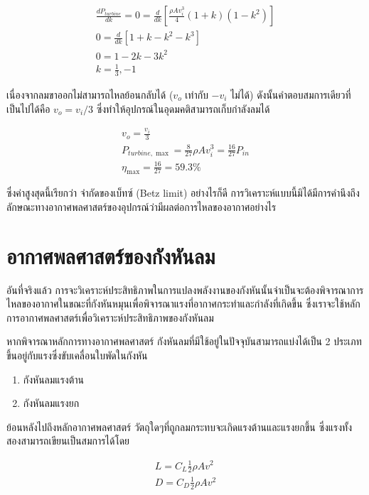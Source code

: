 \message{ !name(solar.tex)}\documentclass[
a4paper,
svgnames,
openany,
justified,
]{tufte-book}
\begin{document}
\begin{gather}
 \frac{dP_{turbine}}{dk} = 0 = \frac{d}{dk} \left[ \frac{\rho A v_i^3}{4} \left( 1 + k \right) \left( 1 - k^2 \right) \right] \nonumber \\
    0 = \frac{d}{dk} \left[ 1 + k - k^2 - k^3 \right] \nonumber \\
    0 = 1 - 2k - 3k^2 \nonumber \\
    k = \frac{1}{3}, -1
\end{gather}

เนื่องจากลมขาออกไม่สามารถไหลย้อนกลับได้ ($v_o$ เท่ากับ $-v_i$ ไม่ได้) ดังนั้นคำตอบสมการเดียวที่เป็นไปได้คือ $v_o = v_i /3$ ซึ่งทำให้อุปกรณ์ในอุดมคติสามารถเก็บกำลังลมได้

\begin{gather*}
    v_o = \frac{v_i}{3} \\
    P_{turbine, \max} = \frac{8}{27} \rho A v_i^3 = \frac{16}{27} P_{in} \\
    \eta_{\max} = \frac{16}{27} = 59.3\%
  \end{gather*}

  ซึ่งค่าสูงสุดนี้เรียกว่า จำกัดของเบ็ทซ์ (Betz limit) อย่างไรก็ดี การวิเคราะห์แบบนี้มิได้มีการคำนึงถึงลักษณะทางอากาศพลศาสตร์ของอุปกรณ์ว่ามีผลต่อการไหลของอากาศอย่างไร

\section{อากาศพลศาสตร์ของกังหันลม}

อันที่จริงแล้ว การจะวิเคราะห์ประสิทธิภาพในการแปลงพลังงานของกังหันนั้นจำเป็นจะต้องพิจารณาการไหลของอากาศในขณะที่กังหันหมุนเพื่อพิจารณาแรงที่อากาศกระทำและกำลังที่เกิดขึ้น ซึ่งเราจะใช้หลักการอากาศพลศาสตร์เพื่อวิเคราะห์ประสิทธิภาพของกังหันลม

หากพิจารณาหลักการทางอากาศพลศาสตร์ กังหันลมที่มีใช้อยู่ในปัจจุบันสามารถแบ่งได้เป็น 2 ประเภทขึ้นอยู่กับแรงซึ่งขับเคลื่อนใบพัดในกังหัน

\begin{enumerate}
\item กังหันลมแรงต้าน
\item กังหันลมแรงยก
\end{enumerate}

ย้อนหลังไปถึงหลักอากาศพลศาสตร์ วัตถุใดๆที่ถูกลมกระทบจะเกิดแรงต้านและแรงยกขึ้น ซึ่งแรงทั้งสองสามารถเขียนเป็นสมการได้โดย

\begin{align}
  \label{eq:lift force}
  L = C_L \frac{1}{2} \rho A v^2 \\
  D = C_D \frac{1}{2} \rho A v^2
\end{align}
\end{document}
